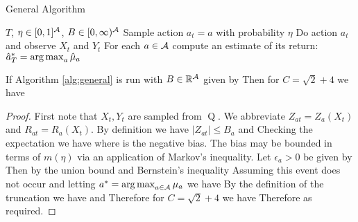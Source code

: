 \begin{algorithm}[H]
\caption{General Algorithm}\label{alg:general}
\begin{algorithmic}
 $T$, $\eta \in [0,1]^{\mathcal A}$, $B \in [0,\infty)^{\mathcal A}$
\STATE Sample action $a_t = a$ with probability $\eta$
\STATE Do action $a_t$ and observe $X_t$ and $Y_t$
\ENDFOR
\STATE For each $a \in \mathcal A$ compute an estimate of its return:
 $\hat a^*_T = \argmax_a \hat \mu_a$
\end{algorithmic}
\end{algorithm}

\begin{theorem}\label{thm:general}
If Algorithm \ref{alg:general} is run with $B \in \mathbb R^{\mathcal A}$ given by
Then for $C = \sqrt{2} + 4$ we have
\end{theorem}


\begin{proof}
First note that $X_t, Y_t$ are sampled from $\operatorname{Q}$.
We abbreviate $Z_{at} = Z_a(X_t)$ and $R_{at} = R_a(X_t)$.
By definition we have $|Z_{at}| \leq B_a$ and 
Checking the expectation we have
where 
is the negative bias. 
The bias may be bounded in terms of $m(\eta)$ via an application of Markov's inequality.
Let $\epsilon_a > 0$ be given by
Then by the union bound and Bernstein's inequality 
Assuming this event does not occur and letting $a^* = \argmax_{a \in \calA} \mu_a$ we have
By the definition of the truncation
we have
and
Therefore for $C = \sqrt{2} + 4$ we have
Therefore
as required.
\end{proof}

